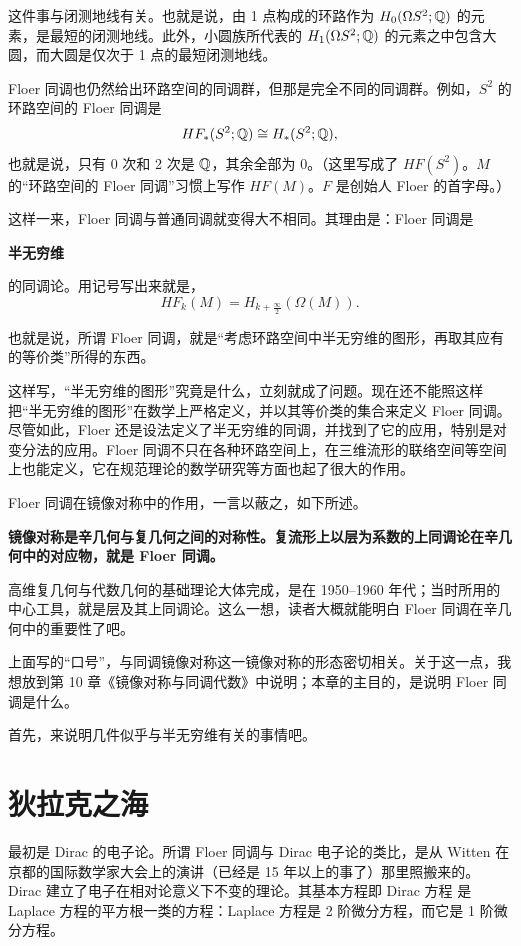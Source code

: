 这件事与闭测地线有关。也就是说，由 1 点构成的环路作为 $H_0(\Omega S^2;\mathbb{Q})$ 的元素，是最短的闭测地线。此外，小圆族所代表的 $H_1(\Omega S^2;\mathbb{Q})$ 的元素之中包含大圆，而大圆是仅次于 1 点的最短闭测地线。

Floer 同调也仍然给出环路空间的同调群，但那是完全不同的同调群。例如，$S^2$ 的环路空间的 Floer 同调是
\[ HF_*(S^2;\mathbb{Q})\cong H_*(S^2;\mathbb{Q}), \]
也就是说，只有 0 次和 2 次是 $\mathbb{Q}$，其余全部为 0。（这里写成了 $HF(S^2)$。$M$ 的“环路空间的 Floer 同调”习惯上写作 $HF(M)$。$F$ 是创始人 Floer 的首字母。）

这样一来，Floer 同调与普通同调就变得大不相同。其理由是：Floer 同调是
\begin{center}
\textbf{半无穷维}
\end{center}
的同调论。用记号写出来就是，
\[ HF_k(M)=H_{k+\frac{\infty}{2}}(\Omega(M)). \]

也就是说，所谓 Floer 同调，就是“考虑环路空间中半无穷维的图形，再取其应有的等价类”所得的东西。

这样写，“半无穷维的图形”究竟是什么，立刻就成了问题。现在还不能照这样把“半无穷维的图形”在数学上严格定义，并以其等价类的集合来定义 Floer 同调。尽管如此，Floer 还是设法定义了半无穷维的同调，并找到了它的应用，特别是对变分法的应用。Floer 同调不只在各种环路空间上，在三维流形的联络空间等空间上也能定义，它在规范理论的数学研究等方面也起了很大的作用。

Floer 同调在镜像对称中的作用，一言以蔽之，如下所述。

\begin{center}
\textbf{镜像对称是辛几何与复几何之间的对称性。复流形上以层为系数的上同调论在辛几何中的对应物，就是 Floer 同调。}
\end{center}

高维复几何与代数几何的基础理论大体完成，是在 1950--1960 年代；当时所用的中心工具，就是层及其上同调论。这么一想，读者大概就能明白 Floer 同调在辛几何中的重要性了吧。

上面写的“口号”，与同调镜像对称这一镜像对称的形态密切相关。关于这一点，我想放到第 10 章《镜像对称与同调代数》中说明；本章的主目的，是说明 Floer 同调是什么。

首先，来说明几件似乎与半无穷维有关的事情吧。

\section{狄拉克之海}

最初是 Dirac 的电子论。所谓 Floer 同调与 Dirac 电子论的类比，是从 Witten 在京都的国际数学家大会上的演讲（已经是 15 年以上的事了）那里照搬来的。Dirac 建立了电子在相对论意义下不变的理论。其基本方程即 Dirac 方程
是 Laplace 方程的平方根一类的方程：Laplace 方程是 2 阶微分方程，而它是 1 阶微分方程。

